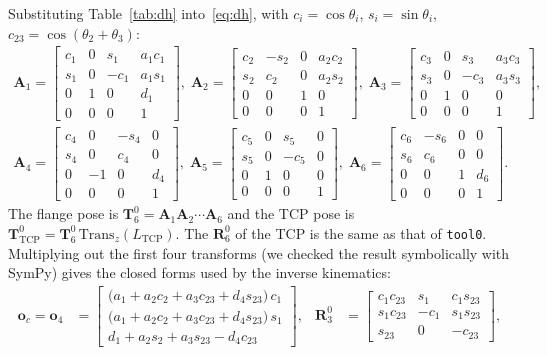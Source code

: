 \documentclass[11pt,a4paper]{article}
\newcommand{\R}[2]{\mathbf{R}^{#1}_{#2}}
\newcommand{\T}[2]{\mathbf{T}^{#1}_{#2}}
\begin{document}
Substituting Table~\ref{tab:dh} into~\eqref{eq:dh}, with
\(c_i=\cos\theta_i\), \(s_i=\sin\theta_i\), \(c_{23} = \cos(\theta_2+\theta_3)\):
\begin{gather*}
\mathbf A_1=\begin{bmatrix}c_1&0&s_1&a_1c_1\\ s_1&0&-c_1&a_1s_1\\0&1&0&d_1\\0&0&0&1\end{bmatrix}\!,\;
\mathbf A_2=\begin{bmatrix}c_2&-s_2&0&a_2c_2\\ s_2&c_2&0&a_2s_2\\0&0&1&0\\0&0&0&1\end{bmatrix}\!,\;
\mathbf A_3=\begin{bmatrix}c_3&0&s_3&a_3c_3\\ s_3&0&-c_3&a_3s_3\\0&1&0&0\\0&0&0&1\end{bmatrix}\!,\\[4pt]
\mathbf A_4=\begin{bmatrix}c_4&0&-s_4&0\\ s_4&0&c_4&0\\0&-1&0&d_4\\0&0&0&1\end{bmatrix}\!,\;
\mathbf A_5=\begin{bmatrix}c_5&0&s_5&0\\ s_5&0&-c_5&0\\0&1&0&0\\0&0&0&1\end{bmatrix}\!,\;
\mathbf A_6=\begin{bmatrix}c_6&-s_6&0&0\\ s_6&c_6&0&0\\0&0&1&d_6\\0&0&0&1\end{bmatrix}\!.
\end{gather*}
The flange pose is \(\T{0}{6}=\mathbf A_1\mathbf A_2\cdots\mathbf A_6\) and the TCP pose is
\(\T{0}{\text{TCP}} = \T{0}{6}\,\mathrm{Trans}_z(L_\text{TCP})\). The \(\mathbf R^0_6\) of the TCP
is the same as that of \texttt{tool0}. Multiplying out the first four transforms (we checked
the result symbolically with SymPy) gives the closed forms used by the inverse kinematics:
\begin{align}
\mathbf o_c = \mathbf o_4 &=
\begin{bmatrix}
\big(a_1 + a_2c_2 + a_3c_{23} + d_4 s_{23}\big)\,c_1\\
\big(a_1 + a_2c_2 + a_3c_{23} + d_4 s_{23}\big)\,s_1\\
d_1 + a_2 s_2 + a_3 s_{23} - d_4 c_{23}
\end{bmatrix}, &
\R{0}{3} &= \begin{bmatrix}
c_1c_{23} & s_1 & c_1 s_{23}\\
s_1c_{23} & -c_1 & s_1 s_{23}\\
s_{23} & 0 & -c_{23}\end{bmatrix},
\label{eq:fkpos}
\end{align}
\end{document}
